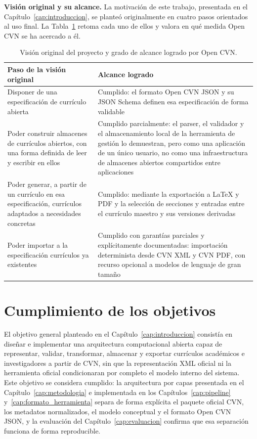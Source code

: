 \textbf{Visión original y su alcance.} La motivación de este trabajo,
presentada en el Capítulo~\ref{cap:introduccion}, se planteó originalmente
en cuatro pasos orientados al uso final. La Tabla~\ref{tab:conclusiones_vision}
retoma cada uno de ellos y valora en qué medida Open CVN se ha acercado a
él.

\begin{table}[htbp]
  \centering
  \footnotesize
  \renewcommand{\arraystretch}{1.45}
  \caption{Visión original del proyecto y grado de alcance logrado por Open CVN.}
  \label{tab:conclusiones_vision}
  \begin{tabular}{p{} p{}}
    \hline
    \textbf{Paso de la visión original} & \textbf{Alcance logrado} \\
    \hline
    Disponer de una especificación de currículo abierta &
    Cumplido: el formato Open CVN JSON y su JSON Schema definen esa
    especificación de forma validable \\
    Poder construir almacenes de currículos abiertos, con una forma
    definida de leer y escribir en ellos &
    Cumplido parcialmente: el parser, el validador y el almacenamiento
    local de la herramienta de gestión lo demuestran, pero como una
    aplicación de un único usuario, no como una infraestructura de
    almacenes abiertos compartidos entre aplicaciones \\
    Poder generar, a partir de un currículo en esa especificación,
    currículos adaptados a necesidades concretas &
    Cumplido: mediante la exportación a LaTeX y PDF y la selección de
    secciones y entradas entre el currículo maestro y sus versiones
    derivadas \\
    Poder importar a la especificación currículos ya existentes &
    Cumplido con garantías parciales y explícitamente documentadas:
    importación determinista desde CVN XML y CVN PDF, con recurso
    opcional a modelos de lenguaje de gran tamaño \\
    \hline
  \end{tabular}
\end{table}

\section{Cumplimiento de los objetivos}
\label{sec:conclusiones_objetivos}

El objetivo general planteado en el Capítulo~\ref{cap:introduccion} consistía
en diseñar e implementar una arquitectura computacional abierta capaz de
representar, validar, transformar, almacenar y exportar currículos
académicos e investigadores a partir de CVN, sin que la representación XML
oficial ni la herramienta oficial condicionaran por completo el modelo
interno del sistema. Este objetivo se considera cumplido: la arquitectura
por capas presentada en el Capítulo~\ref{cap:metodologia} e implementada en
los Capítulos~\ref{cap:pipeline} y~\ref{cap:formato_herramienta} separa de
forma explícita el paquete oficial CVN, los metadatos normalizados, el
modelo conceptual y el formato Open CVN JSON, y la evaluación del
Capítulo~\ref{cap:evaluacion} confirma que esa separación funciona de forma
reproducible.

